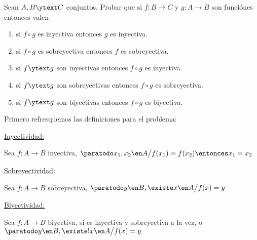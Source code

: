 \begin{enunciado}{\ejercicio}
  Sean $A, B \ytext C$ conjuntos. Probar que si $f: B \to C$ y $g: A \to B$ son funciónes entonces valen
  \begin{enumerate}[label=\roman*), itemsep = -5pt]
    \item si $f \circ g$ es inyectiva entonces $g$ es inyectiva.
    \item si $f \circ g$ es sobreyectiva entonces $f$ es sobreyectiva.
    \item si $f \ytext g$ son inyectivas entonces $f \circ g$ es inyectiva.
    \item si $f \ytext g$ son sobreyectivas entonces $f \circ g$ es sobreyectiva.
    \item si $f \ytext g$ son biyectivas entonces $f \circ g$ es biyectiva.
  \end{enumerate}
\end{enunciado}

Primero refresquemos las definiciones para el problema:

\underline{Inyectividad:}
\begin{center}
  Sea $f:A \to B$ inyectiva,  $\paratodo x_1, x_2 \en A \big/ f(x_1) = f(x_2) \entonces x_1 = x_2$
\end{center}

\underline{Sobreyectividad:}
\begin{center}
  Sea $f:A \to B$ sobreyectiva, $\paratodo y \en B, \existe x \en A \big/ f(x) = y$
\end{center}

\underline{Biyectividad:}
\begin{center}
  Sea $f:A \to B$ biyectiva, si es inyectiva y sobreyectiva a la vez, o $\paratodo y \en B, \existe! x \en A \big/ f(x) = y$
\end{center}

